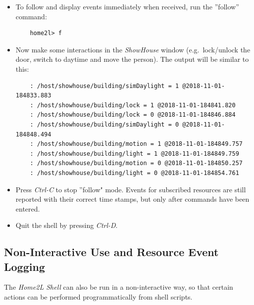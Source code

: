 \documentclass[12pt,english,parskip=half]{scrreprt}
\begin{document}
\begin{itemize}[$\blacktriangleright$]
\item
  To follow and display events immediately when received, run the ''follow'' command:
  \begin{lstlisting}
    home2l> f
  \end{lstlisting}

\item
  Now make some interactions in the \emph{ShowHouse} window
  (e.g.~lock/unlock the door, switch to daytime and move the person).
  The output will be similar to this:
  \begin{lstlisting}
    : /host/showhouse/building/simDaylight = 1 @2018-11-01-184833.883
    : /host/showhouse/building/lock = 1 @2018-11-01-184841.820
    : /host/showhouse/building/lock = 0 @2018-11-01-184846.884
    : /host/showhouse/building/simDaylight = 0 @2018-11-01-184848.494
    : /host/showhouse/building/motion = 1 @2018-11-01-184849.757
    : /host/showhouse/building/light = 1 @2018-11-01-184849.759
    : /host/showhouse/building/motion = 0 @2018-11-01-184850.257
    : /host/showhouse/building/light = 0 @2018-11-01-184854.761
  \end{lstlisting}

\item
  Press \emph{Ctrl-C} to stop ''follow" mode. Events for subscribed resources
  are still reported with their correct time stamps, but only after
  commands have been entered.

\item
  Quit the shell by pressing \emph{Ctrl-D}.

\end{itemize}



\subsection{Non-Interactive Use and Resource Event Logging}
\label{sec:tutorial-shell-scripting}


The \emph{Home2L Shell} can also be run in a non-interactive way, so
that certain actions can be performed programmatically from shell
scripts.
\end{document}
